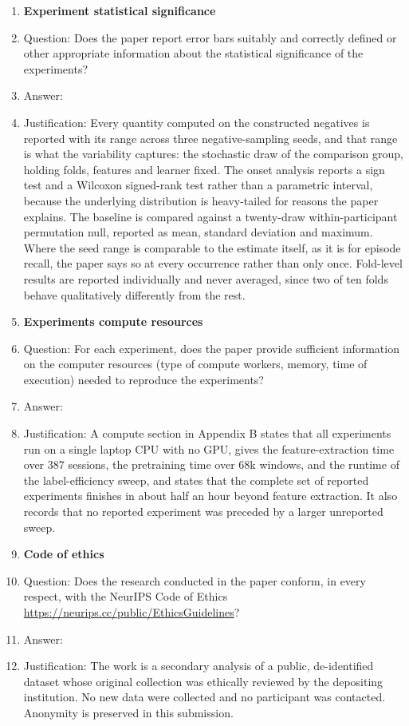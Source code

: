 \begin{enumerate}
\item {\bf Experiment statistical significance}
    \item[] Question: Does the paper report error bars suitably and correctly defined or other appropriate information about the statistical significance of the experiments?
    \item[] Answer: \answerYes{}
    \item[] Justification: Every quantity computed on the constructed negatives is reported with its range across three negative-sampling seeds, and that range is what the variability captures: the stochastic draw of the comparison group, holding folds, features and learner fixed. The onset analysis reports a sign test and a Wilcoxon signed-rank test rather than a parametric interval, because the underlying distribution is heavy-tailed for reasons the paper explains. The baseline is compared against a twenty-draw within-participant permutation null, reported as mean, standard deviation and maximum. Where the seed range is comparable to the estimate itself, as it is for episode recall, the paper says so at every occurrence rather than only once. Fold-level results are reported individually and never averaged, since two of ten folds behave qualitatively differently from the rest.

\item {\bf Experiments compute resources}
    \item[] Question: For each experiment, does the paper provide sufficient information on the computer resources (type of compute workers, memory, time of execution) needed to reproduce the experiments?
    \item[] Answer: \answerYes{}
    \item[] Justification: A compute section in Appendix B states that all experiments run on a single laptop CPU with no GPU, gives the feature-extraction time over 387 sessions, the pretraining time over 68k windows, and the runtime of the label-efficiency sweep, and states that the complete set of reported experiments finishes in about half an hour beyond feature extraction. It also records that no reported experiment was preceded by a larger unreported sweep.

\item {\bf Code of ethics}
    \item[] Question: Does the research conducted in the paper conform, in every respect, with the NeurIPS Code of Ethics \url{https://neurips.cc/public/EthicsGuidelines}?
    \item[] Answer: \answerYes{}
    \item[] Justification: The work is a secondary analysis of a public, de-identified dataset whose original collection was ethically reviewed by the depositing institution. No new data were collected and no participant was contacted. Anonymity is preserved in this submission.


\end{enumerate}
